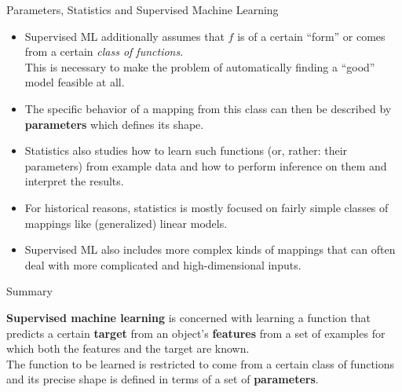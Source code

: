 \documentclass[11pt,compress,t,notes=noshow, xcolor=table]{beamer}
\begin{document}
\begin{vbframe}{Parameters, Statistics and Supervised Machine Learning}

\begin{itemize}
\item Supervised ML additionally assumes that $f$ is of a certain \enquote{form}
or comes from a certain \emph{class of functions}.\\
This is necessary to make the problem of automatically finding a \enquote{good} model feasible at all.
\item The specific behavior of a mapping from this class can then be described by \textbf{parameters} which defines its shape.
\item Statistics also studies how to learn such functions (or, rather: their parameters) from example data and how to perform inference on them and interpret the results.
\item For historical reasons, statistics is mostly focused on fairly simple classes of mappings like (generalized) linear models.
\item Supervised ML also includes more complex kinds of mappings that can often deal with more complicated and high-dimensional inputs.
\end{itemize}
\end{vbframe}


\begin{frame}{Summary}

\textbf{Supervised machine learning} is concerned with learning a function that
predicts a certain \textbf{target} from an object's \textbf{features} from a
set of examples for which both the features and the target are known.\\
The function to be learned is restricted to come from a certain class of functions
and its precise shape is defined in terms of a set of \textbf{parameters}.

\end{frame}


\endlecture
\end{document}
